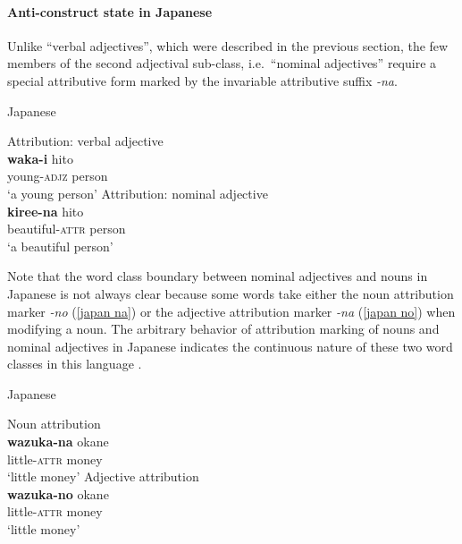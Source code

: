 \paragraph{Anti-construct state in Japanese}
Unlike “verbal adjectives”, which were described in the previous section, the few members of the second adjectival sub-class, i.e.~“nominal adjectives” require a special attributive form marked by the invariable attributive suffix \textit{-na}.
\begin{exe}
\ex \rm{Japanese \citep[72–81]{pustet1989}}%
\begin{xlist}
\ex \rm{Attribution: verbal adjective}\\
\gll	\textbf{waka-i} hito\\
	young-\textsc{adjz} person\\
\glt	‘a young person’
\ex \rm{Attribution: nominal adjective}\\
\gll	\textbf{kiree-na} hito\\
	beautiful-\textsc{attr} person\\
\glt	‘a beautiful person’
\end{xlist}
\end{exe}
Note that the word class boundary between nominal adjectives and nouns in Japanese is not always clear because some words take either the noun attribution marker \textit{-no} (\ref{japan na}) or the adjective attribution marker \textit{-na} (\ref{japan no}) when modifying a noun. The arbitrary behavior of attribution marking of nouns and nominal adjectives in Japanese indicates the continuous nature of these two word classes in this language \citep[79–80]{pustet1989}.
\begin{exe}
\ex \rm{Japanese \citep[72–81]{pustet1989}}%
\begin{xlist}
\ex \rm{Noun attribution}\\ \label{japan na}
\gll	\textbf{wazuka-na} okane\\
	little-\textsc{attr} money\\
\glt	‘little money’
\ex \rm{Adjective attribution}\\ \label{japan no}
\gll	\textbf{wazuka-no} okane\\
	little-\textsc{attr} money\\
\glt	‘little money’
\end{xlist}
\end{exe}

